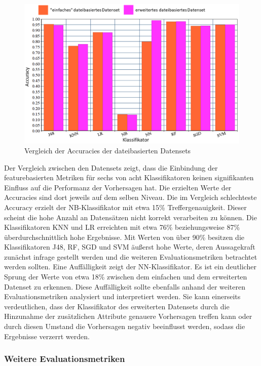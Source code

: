 \begin{figure}[ht]
    \centering
    \includegraphics[width=\textwidth]{images/final_eval}
    \caption{Vergleich der Accuracies der dateibasierten Datensets\label{fig:final-eval}}
\end{figure}

Der Vergleich zwischen den Datensets zeigt, dass die Einbindung der featurebasierten Metriken für sechs von acht Klassifikatoren keinen signifikanten Einfluss auf die Performanz der Vorhersagen hat. Die erzielten Werte der Accuracies sind dort jeweils auf dem selben Niveau. Die im Vergleich schlechteste Accuracy erzielt der NB-Klassifikator mit etwa 15\% Treffergenauigkeit. Dieser scheint die hohe Anzahl an Datensätzen nicht korrekt verarbeiten zu können. Die Klassifikatoren KNN und LR erreichten mit etwa 76\% beziehungsweise 87\% überdurchschnittlich hohe Ergebnisse. Mit Werten von über 90\% besitzen die Klassifikatoren J48, RF, SGD und SVM äußerst hohe Werte, deren Aussagekraft zunächst infrage gestellt werden und die weiteren Evaluationsmetriken betrachtet werden sollten.
Eine Auffälligkeit zeigt der NN-Klassifikator. Es ist ein deutlicher Sprung der Werte von etwa 18\% zwischen dem \glqq einfachen\grqq{} und dem erweiterten Datenset zu erkennen. Diese Auffälligkeit sollte ebenfalls anhand der weiteren Evaluationsmetriken analysiert und interpretiert werden. Sie kann einerseits verdeutlichen, dass der Klassifikator des erweiterten Datensets durch die Hinzunahme der zusätzlichen Attribute genauere Vorhersagen treffen kann oder durch diesen Umstand die Vorhersagen negativ beeinflusst werden, sodass die Ergebnisse verzerrt werden.

\subsubsection*{Weitere Evaluationsmetriken}

